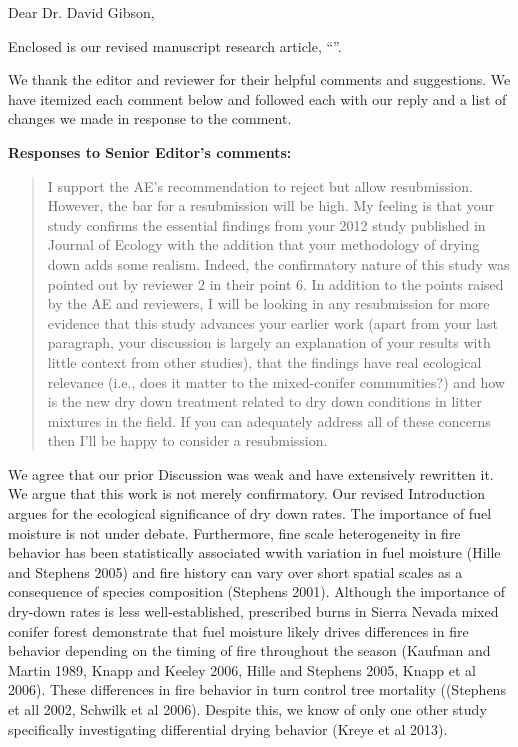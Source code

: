 \documentclass[letterpaper, 12pt]{letter}
\begin{document}
\begin{letter}{}

\opening{Dear Dr. David Gibson,}

Enclosed is our revised manuscript research article, ``''.

We thank the editor and reviewer for their helpful comments and suggestions. We
have itemized each comment below and followed each with our reply and a list of
changes we made in response to the comment. 

{\bf Responses to Senior Editor's comments:}

\begin{quote}
I support the AE's recommendation to reject but allow resubmission. However, the bar for a resubmission will be high. My feeling is that your study confirms the essential findings from your 2012 study published in Journal of Ecology with the addition that your methodology of drying down adds some realism. Indeed, the confirmatory nature of this study was pointed out by reviewer 2 in their point 6. In addition to the points raised by the AE and reviewers, I will be looking in any resubmission for more evidence that this study advances your earlier work (apart from your last paragraph, your discussion is largely an explanation of your results with little context from other studies), that the findings have real ecological relevance (i.e., does it matter to the mixed-conifer communities?) and how is the new dry down treatment related to dry down conditions in litter mixtures in the field. If you can adequately address all of these concerns then I'll be happy to consider a resubmission.
\end{quote}

We agree that our prior Discussion was weak and have extensively rewritten it.
We argue that this work is not merely confirmatory. Our revised Introduction
argues for the ecological significance of dry down rates. The importance of
fuel moisture is not under debate. Furthermore, fine scale heterogeneity in
fire behavior has been statistically associated wwith variation in fuel
moisture (Hille and Stephens 2005) and fire history can vary over short spatial
scales as a consequence of species composition (Stephens 2001). Although the
importance of dry-down rates is less well-established, prescribed burns in
Sierra Nevada mixed conifer forest demonstrate that fuel moisture likely drives
differences in fire behavior depending on the timing of fire throughout the
season (Kaufman and Martin 1989, Knapp and Keeley 2006, Hille and Stephens
2005, Knapp et al 2006). These differences in fire behavior in turn control
tree mortality ((Stephens et all 2002, Schwilk et al 2006). Despite this, we
know of only one other study specifically investigating differential drying
behavior (Kreye et al 2013).


\end{letter}
\end{document}
